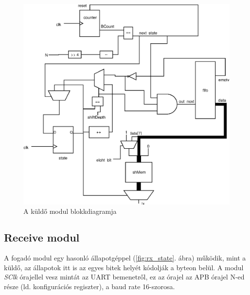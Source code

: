 \begin{figure}[h]
\vspace{0.5cm}
\begin{center}
\includegraphics{figures/transmit.eps}
\caption{A küldő modul blokkdiagramja}
\label{fig:transmit}
\end{center}
\vspace{0.5cm}
\end{figure}

\clearpage
\subsection{Receive modul}
A fogadó modul egy hasonló állapotgéppel (\ref{fig:rx_state}. ábra) működik, mint a küldő, az állapotok itt is az egyes bitek helyét kódolják a byteon belül. A modul \textit{SClk} órajellel vesz mintát az UART bemenetről, ez az órajel az APB órajel N-ed része (ld. konfigurációs regiszter), a baud rate 16-szorosa. 

